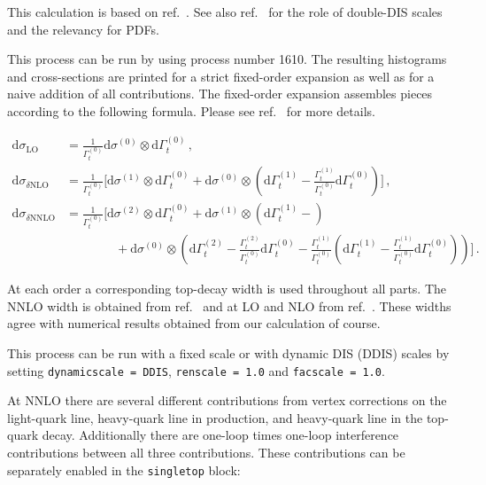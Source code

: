 \label{single-top-quark-production-and-decay-at-nnlo}

This calculation is based on ref.~\cite{Campbell:2020fhf}. See also
ref.~\cite{Campbell:2021qgd} for the role of double-DIS scales and the
relevancy for PDFs.

This process can be run by using process number 1610. The resulting
histograms and cross-sections are printed for a strict fixed-order
expansion as well as for a naive addition of all contributions. The
fixed-order expansion assembles pieces according to the following
formula. Please see ref.~\cite{Campbell:2020fhf} for more details.

\[\begin{aligned}
\mathrm{d}\sigma_{\text{LO}} & = \frac{1}{\Gamma_t^{(0)}}
\mathrm{d}\sigma^{(0)}\otimes\mathrm{d}\Gamma_t^{(0)} \,,\\
\mathrm{d}\sigma_{\delta \text{NLO}} & = \frac{1}{\Gamma_t^{(0)}} \Bigg[ 
\mathrm{d}\sigma^{(1)}\otimes\mathrm{d}\Gamma_t^{(0)} + 
\mathrm{d}\sigma^{(0)}\otimes\left(\mathrm{d}\Gamma_t^{(1)} 
- \frac{\Gamma_t^{(1)}}{\Gamma_t^{(0)}} \mathrm{d}\Gamma_t^{(0)}  \right)
\Bigg] \,,\\
\mathrm{d}\sigma_{\delta \text{NNLO}} & = \frac{1}{\Gamma_t^{(0)}} \Bigg[
\mathrm{d}\sigma^{(2)}\otimes\mathrm{d}\Gamma_t^{(0)} + 
\mathrm{d}\sigma^{(1)}\otimes\left(
\mathrm{d}\Gamma_t^{(1)} - 
\right) \\
& \qquad\qquad  + \mathrm{d}\sigma^{(0)}\otimes \left(
\mathrm{d}\Gamma_t^{(2)} - 
\frac{\Gamma_t^{(2)}}{\Gamma_t^{(0)}}\mathrm{d}\Gamma_t^{(0)}
-\frac{\Gamma_t^{(1)}}{\Gamma_t^{(0)}} \left(
\mathrm{d}\Gamma_t^{(1)} - \frac{\Gamma_t^{(1)}}{\Gamma_t^{(0)}}
\mathrm{d}\Gamma_t^{(0)}
\right)
\right) \Bigg] \,.
\end{aligned}\]

At each order a corresponding top-decay width is used throughout all
parts. The NNLO width is obtained from ref.~\cite{Blokland:2005vq} and at
LO and NLO from ref.~\cite{Czarnecki:1990kv}. These widths agree with
numerical results obtained from our calculation of course.

This process can be run with a fixed scale or with dynamic DIS (DDIS)
scales by setting \texttt{dynamicscale\ =\ DDIS},
\texttt{renscale\ =\ 1.0} and \texttt{facscale\ =\ 1.0}.

At NNLO there are several different contributions from vertex
corrections on the light-quark line, heavy-quark line in production, and
heavy-quark line in the top-quark decay. Additionally there are one-loop
times one-loop interference contributions between all three
contributions. These contributions can be separately enabled in the
\texttt{singletop} block:

